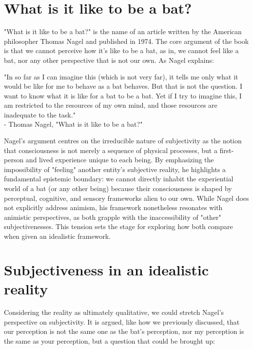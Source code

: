 \section{What is it like to be a bat?}
"What is it like to be a bat?" is the name of an article written by the American philosopher
Thomas Nagel and published in 1974. The core argument of the book is that we cannot perceive
how it's like to be a bat, as in, we cannot feel like a bat, nor any other perspective that
is not our own. As Nagel explains:

\begin{center}
    \itshape
    \parbox{0.7\textwidth}{
    "In so far as I can imagine this (which is not very far), it tells me only what it would
    be like for me to behave as a bat behaves. But that is not the question. I want to know
    what it is like for a bat to be a bat. Yet if I try to imagine this, I am restricted to
    the resources of my own mind, and those resources are inadequate to the task."\\
    \normalfont - Thomas Nagel, "What is it like to be a bat?" \cite{Nagel2024}
    }
\end{center}

Nagel's argument centres on the irreducible nature of subjectivity as the notion that
consciousness is not merely a sequence of physical processes, but a first-person and lived
experience unique to each being. By emphasizing the impossibility of "feeling" another
entity's subjective reality, he highlights a fundamental epistemic boundary: we cannot directly
inhabit the experiential world of a bat (or any other being) because their consciousness is shaped
by perceptual, cognitive, and sensory frameworks alien to our own. While Nagel does not
explicitly address animism, his framework nonetheless resonates with animistic perspectives, as
both grapple with the inaccessibility of "other" subjectivenesses. This tension sets the stage
for exploring how both compare when given an idealistic framework.

\section{Subjectiveness in an idealistic reality}
Considering the reality as ultimately qualitative, we could stretch Nagel's perspective on
subjectivity. It is argued, like how we previously discussed, that our perception is not the
same one as the bat's perception, nor my perception is the same as your perception, but a question
that could be brought up:

